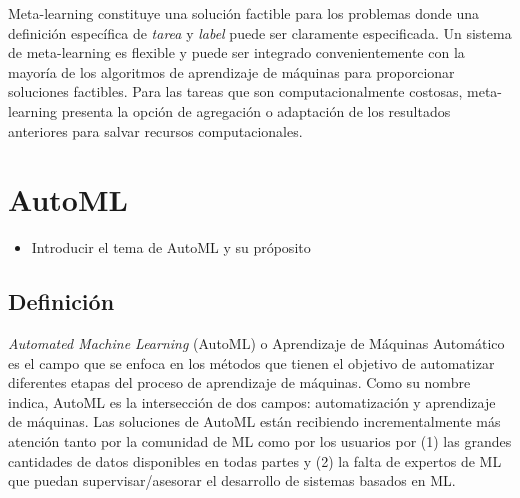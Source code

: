 Meta-learning constituye una solución factible para los problemas donde una definición específica de \textit{tarea} y \textit{label} puede ser claramente especificada. Un sistema de meta-learning es flexible y puede ser integrado convenientemente con la mayoría de los algoritmos de aprendizaje de máquinas para proporcionar soluciones factibles. Para las tareas que son computacionalmente costosas, meta-learning presenta la opción de agregación o adaptación de los resultados anteriores para salvar recursos computacionales.
 
\section{AutoML}\label{sec:automl}

\begin{itemize}
	\item Introducir el tema de AutoML y su próposito
\end{itemize}

\subsection{Definición}\label{subsec:automl_definition}



\textit{Automated Machine Learning} (AutoML) o Aprendizaje de Máquinas Automático es el campo que se enfoca en los métodos que tienen el objetivo de automatizar diferentes etapas del proceso de aprendizaje de máquinas. Como su nombre indica, AutoML es la intersección de dos campos: automatización y aprendizaje de máquinas. Las soluciones de AutoML están recibiendo incrementalmente más atención tanto por la comunidad de ML como por los usuarios por (1) las grandes cantidades de datos disponibles en todas partes y (2) la falta de expertos de ML que puedan supervisar/asesorar el desarrollo de sistemas basados en ML.

